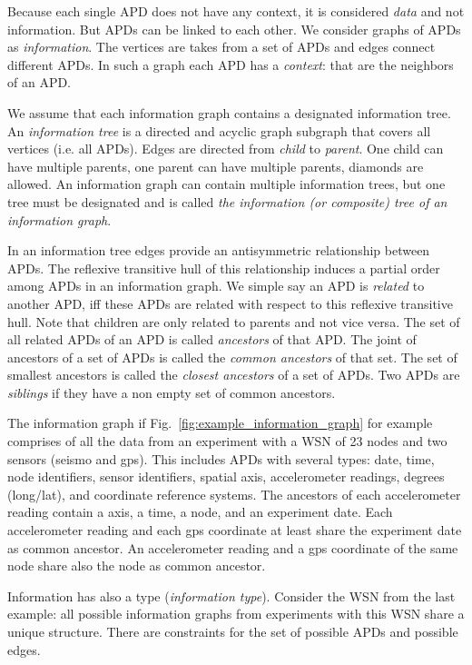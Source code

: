 Because each single APD does not have any context, it is considered \emph{data} and not information. But APDs can be linked to each other. We consider graphs of APDs as \emph{information}. The vertices are takes from a set of APDs and edges connect different APDs. In such a graph each APD has a \emph{context}: that are the neighbors of an APD. 

We assume that each information graph contains a designated information tree. 
An \emph{information tree} is a directed and acyclic graph subgraph that covers all vertices (i.e. all APDs). Edges are directed from \emph{child} to \emph{parent}. One child can have multiple parents, one parent can have multiple parents, diamonds are allowed. An information graph can contain multiple information trees, but one tree must be designated and is called \emph{the information (or composite) tree of an information graph}. 

In an information tree edges provide an antisymmetric relationship between APDs. The reflexive transitive hull of this relationship induces a partial order among APDs in an information graph. We simple say an APD is \emph{related} to another APD, iff these APDs are related with respect to this reflexive transitive hull. Note that children are only related to parents and not vice versa. The set of all related APDs of an APD is called \emph{ancestors} of that APD. The joint of ancestors of a set of APDs is called the \emph{common ancestors} of that set. The set of smallest ancestors is called the \emph{closest ancestors} of a set of APDs. Two APDs are \emph{siblings} if they have a non empty set of common ancestors. 

The information graph if Fig.~\ref{fig:example_information_graph} for example comprises of all the data from an experiment with a WSN of 23 nodes and two sensors (seismo and gps). This includes APDs with several types: date, time, node identifiers, sensor identifiers, spatial axis, accelerometer readings, degrees (long/lat), and coordinate reference systems. The ancestors of each accelerometer reading contain a axis, a time, a node, and an experiment date. Each accelerometer reading and each gps coordinate at least share the experiment date as common ancestor. An accelerometer reading and a gps coordinate of the same node share also the node as common ancestor. 

Information has also a type (\emph{information type}). Consider the WSN from the last example: all possible information graphs from experiments with this WSN share a unique structure. There are constraints for the set of possible APDs and possible edges.

